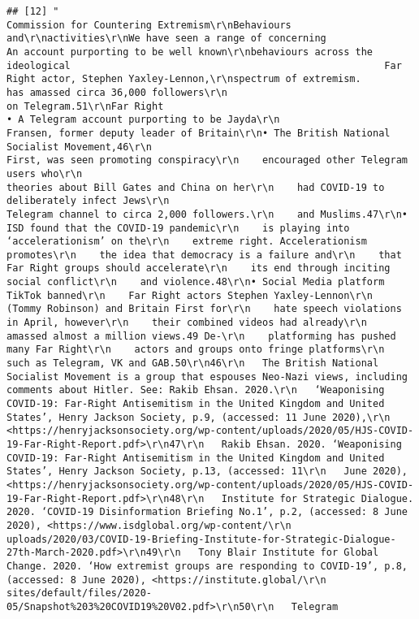 \documentclass[
]{book}
\begin{document}
\begin{verbatim}
## [12] "                                                    Commission for Countering Extremism\r\nBehaviours and\r\nactivities\r\nWe have seen a range of concerning                                                     An account purporting to be well known\r\nbehaviours across the ideological                                                      Far Right actor, Stephen Yaxley-Lennon,\r\nspectrum of extremism.                                                                 has amassed circa 36,000 followers\r\n                                                                                       on Telegram.51\r\nFar Right                                                                         • A Telegram account purporting to be Jayda\r\n                                                                                       Fransen, former deputy leader of Britain\r\n• The British National Socialist Movement,46\r\n                                                                                       First, was seen promoting conspiracy\r\n    encouraged other Telegram users who\r\n                                                                                       theories about Bill Gates and China on her\r\n    had COVID-19 to deliberately infect Jews\r\n                                                                                       Telegram channel to circa 2,000 followers.\r\n    and Muslims.47\r\n• ISD found that the COVID-19 pandemic\r\n    is playing into ‘accelerationism’ on the\r\n    extreme right. Accelerationism promotes\r\n    the idea that democracy is a failure and\r\n    that Far Right groups should accelerate\r\n    its end through inciting social conflict\r\n    and violence.48\r\n• Social Media platform TikTok banned\r\n    Far Right actors Stephen Yaxley-Lennon\r\n    (Tommy Robinson) and Britain First for\r\n    hate speech violations in April, however\r\n    their combined videos had already\r\n    amassed almost a million views.49 De-\r\n    platforming has pushed many Far Right\r\n    actors and groups onto fringe platforms\r\n    such as Telegram, VK and GAB.50\r\n46\r\n   The British National Socialist Movement is a group that espouses Neo-Nazi views, including comments about Hitler. See: Rakib Ehsan. 2020.\r\n   ‘Weaponising COVID-19: Far-Right Antisemitism in the United Kingdom and United States’, Henry Jackson Society, p.9, (accessed: 11 June 2020),\r\n   <https://henryjacksonsociety.org/wp-content/uploads/2020/05/HJS-COVID-19-Far-Right-Report.pdf>\r\n47\r\n   Rakib Ehsan. 2020. ‘Weaponising COVID-19: Far-Right Antisemitism in the United Kingdom and United States’, Henry Jackson Society, p.13, (accessed: 11\r\n   June 2020), <https://henryjacksonsociety.org/wp-content/uploads/2020/05/HJS-COVID-19-Far-Right-Report.pdf>\r\n48\r\n   Institute for Strategic Dialogue. 2020. ‘COVID-19 Disinformation Briefing No.1’, p.2, (accessed: 8 June 2020), <https://www.isdglobal.org/wp-content/\r\n   uploads/2020/03/COVID-19-Briefing-Institute-for-Strategic-Dialogue-27th-March-2020.pdf>\r\n49\r\n   Tony Blair Institute for Global Change. 2020. ‘How extremist groups are responding to COVID-19’, p.8, (accessed: 8 June 2020), <https://institute.global/\r\n   sites/default/files/2020-05/Snapshot%203%20COVID19%20V02.pdf>\r\n50\r\n   Telegram 
\end{verbatim}
\end{document}
